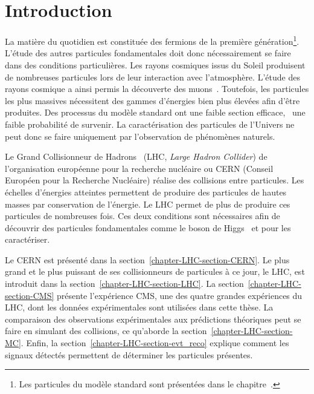 \section{Introduction}\label{chapter-LHC-section-introduction}
La matière \og du quotidien \fg{} est constituée des fermions de la première génération\footnote{Les particules du modèle standard sont présentées dans le chapitre~.}.
L'étude des autres particules fondamentales doit donc nécessairement se faire dans des conditions particulières.
Les rayons cosmiques issus du Soleil produisent de nombreuses particules lors de leur interaction avec l'atmosphère.
L'étude des rayons cosmique a ainsi permis la découverte des muons~\cite{muon_discovery}.
Toutefois, les particules les plus massives nécessitent des gammes d'énergies bien plus élevées afin d'être produites.
Des processus du modèle standard ont une faible section efficace, \ie\ une faible probabilité de survenir.
La caractérisation des particules de l'Univers ne peut donc se faire uniquement par l'observation de phénomènes naturels.
\par Le Grand Collisionneur de Hadrons~\cite{LHC_paper} (LHC, \emph{Large Hadron Collider}) de l'organisation européenne pour la recherche nucléaire ou CERN (Conseil Européen pour la Recherche Nucléaire) réalise des collisions entre particules.
Les échelles d'énergies atteintes permettent de produire des particules de hautes masses par conservation de l'énergie.
Le LHC permet de plus de produire ces particules de nombreuses fois.
Ces deux conditions sont nécessaires afin de découvrir des particules fondamentales comme le boson de Higgs~\cite{ATLAS_Higgs_discovery,CMS_Higgs_discovery,CMS_Higgs_discovery_2013,ATLAS-CMS-Higgs_combined_1,ATLAS-CMS-Higgs_combined_2} et pour les caractériser.
\par Le CERN est présenté dans la section~\ref{chapter-LHC-section-CERN}.
Le plus grand et le plus puissant de ses collisionneurs de particules à ce jour, le LHC, est introduit dans la section~\ref{chapter-LHC-section-LHC}.
La section~\ref{chapter-LHC-section-CMS} présente l'expérience CMS, une des quatre grandes expériences du LHC, dont les données expérimentales sont utilisées dans cette thèse.
La comparaison des observations expérimentales aux prédictions théoriques peut se faire en simulant des collisions, ce qu'aborde la section~\ref{chapter-LHC-section-MC}.
Enfin, la section~\ref{chapter-LHC-section-evt_reco} explique comment les signaux détectés permettent de déterminer les particules présentes.